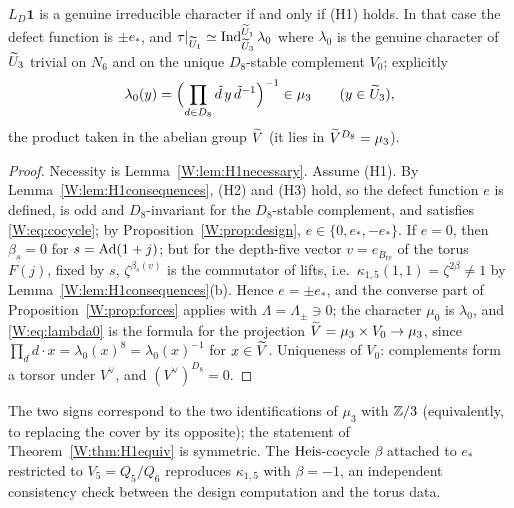 \begin{theorem}\label{W:thm:H1equiv}
$L_D\mathbf1$ is a genuine irreducible character if and only if (H1)
holds.  In that case the defect function is $\pm e_*$, and
$\tau|_{\widetilde U_1}\simeq\operatorname{Ind}_{\widetilde U_3}^{\widetilde U_1}\lambda_0$ where $\lambda_0$ is the
genuine character of $\widetilde U_3$ trivial on $N_6$ and on the unique
$D_8$-stable complement $V_0$; explicitly
\begin{equation}\label{W:eq:lambda0}
 \lambda_0(y)=\Bigl(\prod_{d\in D_8}\tilde d\,y\,\tilde d^{-1}\Bigr)^{-1}
 \in\mu_3\qquad(y\in\widetilde U_3),
\end{equation}
the product taken in the abelian group $\widetilde V$ (it lies in $\widetilde V^{D_8}=\mu_3$).
\end{theorem}
\begin{proof}
Necessity is Lemma~\ref{W:lem:H1necessary}.  Assume (H1).  By
Lemma~\ref{W:lem:H1consequences}, (H2) and (H3) hold, so the defect
function $e$ is defined, is odd and $D_8$-invariant for the
$D_8$-stable complement, and satisfies \eqref{W:eq:cocycle}; by
Proposition~\ref{W:prop:design}, $e\in\{0,e_*,-e_*\}$.  If $e=0$, then
$\beta_s=0$ for $s=\operatorname{Ad}(1+j)$; but for the depth-five vector
$v=e_{B_{\mathrm{re}}}$ of the torus $F(j)$, fixed by $s$,
$\zeta^{\beta_s(v)}$ is the commutator of lifts, i.e.\
$\kappa_{1,5}(1,1)=\zeta^{2\beta}\ne1$ by Lemma~\ref{W:lem:H1consequences}(b).
Hence $e=\pm e_*$, and the converse part of Proposition~\ref{W:prop:forces}
applies with $\Lambda=\Lambda_\pm\ni0$; the character $\mu_0$ is
$\lambda_0$, and \eqref{W:eq:lambda0} is the formula for the projection
$\widetilde V=\mu_3\times V_0\to\mu_3$, since $\prod_{d}d\cdot x=\lambda_0(x)^8=\lambda_0(x)^{-1}$
for $x\in\widetilde V$.  Uniqueness of $V_0$: complements form a torsor under
$V^\vee$, and $(V^\vee)^{D_8}=0$.
\end{proof}

\begin{remark}
The two signs correspond to the two identifications of $\mu_3$ with
$\mathbb Z/3$ (equivalently, to replacing the cover by its opposite); the
statement of Theorem~\ref{W:thm:H1equiv} is symmetric.  The
$\mathrm{Heis}$-cocycle $\beta$ attached to $e_*$ restricted to
$V_5=Q_5/Q_6$ reproduces $\kappa_{1,5}$ with $\beta=-1$, an independent
consistency check between the design computation and the torus data.
\end{remark}

